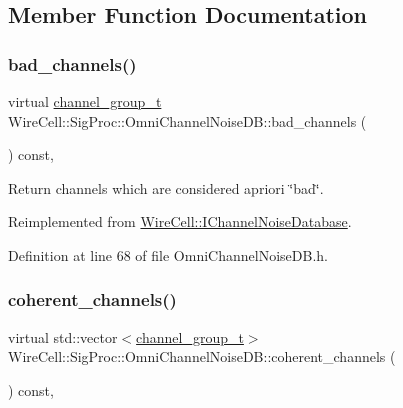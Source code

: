 \subsection{Member Function Documentation}
\mbox{\label{class_wire_cell_1_1_sig_proc_1_1_omni_channel_noise_d_b_a04ee13cfae6285a0c0ac160a259fb2b5}} 
\subsubsection{\texorpdfstring{bad\+\_\+channels()}{bad\_channels()}}
{\footnotesize\ttfamily virtual \hyperlink{class_wire_cell_1_1_i_channel_noise_database_a7fedd6ab67ba4e7eeb8cf182cc9dc6b1}{channel\+\_\+group\+\_\+t} Wire\+Cell\+::\+Sig\+Proc\+::\+Omni\+Channel\+Noise\+D\+B\+::bad\+\_\+channels (\begin{DoxyParamCaption}{ }\end{DoxyParamCaption}) const\hspace{0.3cm}{\ttfamily [inline]}, {\ttfamily [virtual]}}



Return channels which are considered a\textquotesingle{}priori \char`\"{}bad\char`\"{}. 



Reimplemented from \hyperlink{class_wire_cell_1_1_i_channel_noise_database_a70f4c0a24525f6a7c8ef84245fd6d01e}{Wire\+Cell\+::\+I\+Channel\+Noise\+Database}.



Definition at line 68 of file Omni\+Channel\+Noise\+D\+B.\+h.

\mbox{\label{class_wire_cell_1_1_sig_proc_1_1_omni_channel_noise_d_b_a8cdff2a7435fc85ff77b234a88aaaece}} 
\subsubsection{\texorpdfstring{coherent\+\_\+channels()}{coherent\_channels()}}
{\footnotesize\ttfamily virtual std\+::vector$<$\hyperlink{class_wire_cell_1_1_i_channel_noise_database_a7fedd6ab67ba4e7eeb8cf182cc9dc6b1}{channel\+\_\+group\+\_\+t}$>$ Wire\+Cell\+::\+Sig\+Proc\+::\+Omni\+Channel\+Noise\+D\+B\+::coherent\+\_\+channels (\begin{DoxyParamCaption}{ }\end{DoxyParamCaption}) const\hspace{0.3cm}{\ttfamily [inline]}, {\ttfamily [virtual]}}



